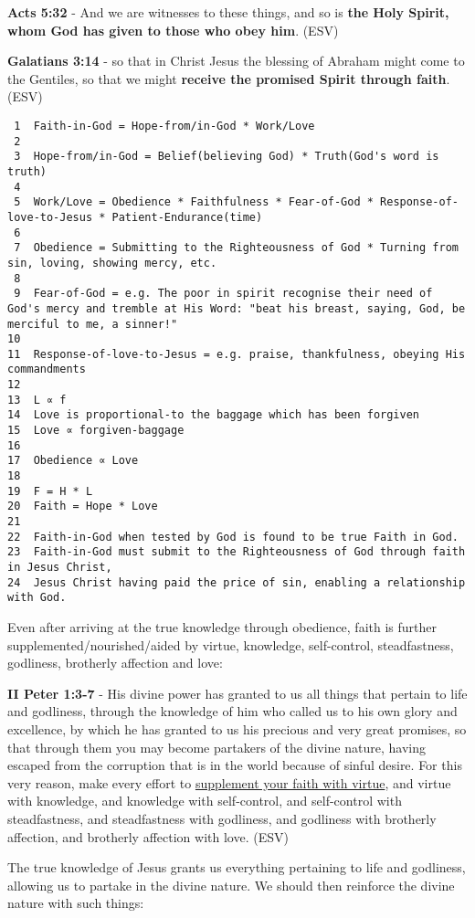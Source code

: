 \documentclass[11pt]{article}
\begin{document}
\textbf{Acts 5:32} - And we are witnesses to these things, and so is \textbf{the Holy Spirit, whom God has given to those who obey him}. (ESV)

\textbf{Galatians 3:14} - so that in Christ Jesus the blessing of Abraham might come to the Gentiles, so that we might \textbf{receive the promised Spirit through faith}. (ESV)

\begin{verbatim}
 1  Faith-in-God = Hope-from/in-God * Work/Love
 2  
 3  Hope-from/in-God = Belief(believing God) * Truth(God's word is truth)
 4  
 5  Work/Love = Obedience * Faithfulness * Fear-of-God * Response-of-love-to-Jesus * Patient-Endurance(time)
 6  
 7  Obedience = Submitting to the Righteousness of God * Turning from sin, loving, showing mercy, etc.
 8  
 9  Fear-of-God = e.g. The poor in spirit recognise their need of God's mercy and tremble at His Word: "beat his breast, saying, God, be merciful to me, a sinner!"
10  
11  Response-of-love-to-Jesus = e.g. praise, thankfulness, obeying His commandments
12  
13  L ∝ f
14  Love is proportional-to the baggage which has been forgiven
15  Love ∝ forgiven-baggage
16  
17  Obedience ∝ Love
18  
19  F = H * L
20  Faith = Hope * Love
21  
22  Faith-in-God when tested by God is found to be true Faith in God.
23  Faith-in-God must submit to the Righteousness of God through faith in Jesus Christ,
24  Jesus Christ having paid the price of sin, enabling a relationship with God.
\end{verbatim}

Even after arriving at the true knowledge through obedience, faith is further supplemented/nourished/aided by virtue, knowledge, self-control, steadfastness, godliness, brotherly affection and love:

\textbf{II Peter 1:3-7} - His divine power has granted to us all things that pertain to life and godliness, through the knowledge of him who called us to his own glory and excellence, by which he has granted to us his precious and very great promises, so that through them you may become partakers of the divine nature, having escaped from the corruption that is in the world because of sinful desire. For this very reason, make every effort to \uline{supplement your faith with virtue}, and virtue with knowledge, and knowledge with self-control, and self-control with steadfastness, and steadfastness with godliness, and godliness with brotherly affection, and brotherly affection with love. (ESV)

The true knowledge of Jesus grants us everything pertaining to life and godliness, allowing us to partake in the divine nature. We should then reinforce the divine nature with such things:
\end{document}
